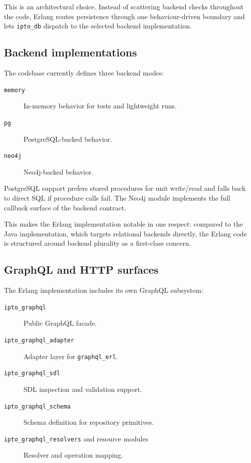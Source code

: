 This is an architectural choice. Instead of scattering backend checks throughout the code, Erlang routes persistence through one behaviour-driven boundary and lets \texttt{ipto\_db} dispatch to the selected backend implementation.

\subsection{Backend implementations}

The codebase currently defines three backend modes:
\begin{description}
\item[\texttt{memory}] In-memory behavior for tests and lightweight runs.
\vspace{.2cm}
\item[\texttt{pg}] PostgreSQL-backed behavior.
\vspace{.2cm}
\item[\texttt{neo4j}] Neo4j-backed behavior.
\end{description}

PostgreSQL support prefers stored procedures for unit write/read and falls back to direct SQL if procedure calls fail. The Neo4j module implements the full callback surface of the backend contract.

This makes the Erlang implementation notable in one respect: compared to the Java implementation, which targets relational backends directly, the Erlang code is structured around backend plurality as a first-class concern.

\subsection{GraphQL and HTTP surfaces}

The Erlang implementation includes its own GraphQL subsystem:
\begin{description}
\item[\texttt{ipto\_graphql}] Public GraphQL facade.
\vspace{.2cm}
\item[\texttt{ipto\_graphql\_adapter}] Adapter layer for \texttt{graphql\_erl}.
\vspace{.2cm}
\item[\texttt{ipto\_graphql\_sdl}] SDL inspection and validation support.
\vspace{.2cm}
\item[\texttt{ipto\_graphql\_schema}] Schema definition for repository primitives.
\vspace{.2cm}
\item[\texttt{ipto\_graphql\_resolvers} and resource modules] Resolver and operation mapping.
\end{description}

